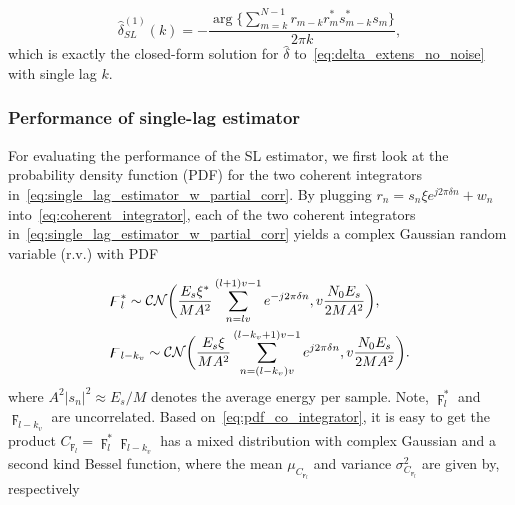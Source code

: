 \begin{equation}
  \label{eq:single_lag_estimator_wout_partial_corr}
  \hat{\delta}_{SL}^{(1)}(k)=-\frac{\arg\big\{\sum_{m=k}^{N-1}r_{m-k}r_m^*s_{m-k}^*s_m\big\}}{2\pi k},
\end{equation}
which is exactly the closed-form solution for $\hat{\delta}$ to~\eqref{eq:delta_extens_no_noise} with single lag $k$.

\subsubsection{Performance of single-lag estimator}

For evaluating the performance of the SL estimator,
we first look at the probability density function (PDF) for the two coherent integrators in~\eqref{eq:single_lag_estimator_w_partial_corr}.
By plugging $r_n=s_n\xi e^{j2\pi \delta n}+w_n$ into~\eqref{eq:coherent_integrator}, each of
the two coherent integrators in~\eqref{eq:single_lag_estimator_w_partial_corr} yields a complex Gaussian
random variable (r.v.) with PDF

\begin{equation}
  \label{eq:pdf_co_integrator}
  \begin{aligned}
    &\digamma_l^* \sim \mathcal{CN}\bigg(\frac{E_s\xi^*}{MA^2}\sum_{n=lv}^{(l+1)v-1}e^{-j2\pi \delta n},v\frac{N_0E_s}{2MA^2}\bigg), \\
    &\digamma_{l-k_v} \sim \mathcal{CN}\bigg(\frac{E_s\xi}{MA^2}\sum_{n=(l-k_v)v}^{(l-k_v+1)v-1}e^{j2\pi \delta n},v\frac{N_0E_s}{2MA^2}\bigg).
  \end{aligned}
\end{equation}
where $A^2|s_n|^2 \approx E_s/M$ denotes the average energy per sample.
Note, $\digamma_l^*$ and $\digamma_{l-k_v}$ are uncorrelated. Based on~\eqref{eq:pdf_co_integrator}, 
it is easy to get the product $C_{\digamma_{l}}=\digamma_l^*\digamma_{l-k_v}$ has a mixed distribution with complex Gaussian and a
second kind Bessel function, where the mean $\mu_{C_{\digamma_{l}}}$ and variance $\sigma^2_{C_{\digamma_{l}}}$ are given by, respectively

